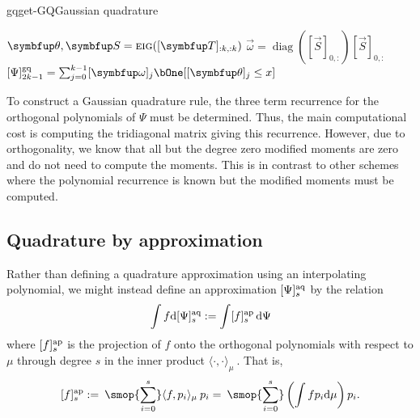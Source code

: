 \begin{labelalgorithm}[H]{gq}{get-GQ}{Gaussian quadrature}
\begin{algorithmic}[1]
    \State \( \vec{\theta}, \vec{S} = \textsc{eig}([\vec{T}]_{:k,:k}) \) 
    \State \( \vec{\omega} = \operatorname{diag}([\vec{S}]_{0,:}) [\vec{S}]_{0,:} \)
    \State \Return \( \qq[g]{\Psi}{2k-1} = \sum_{j=0}^{k-1} [\vec{\omega}]_j \bOne[[\vec{\theta}]_j \leq x] \)
\EndProcedure
\end{algorithmic}
\end{labelalgorithm}

\begin{remark}
    To construct a Gaussian quadrature rule, the three term recurrence for the orthogonal polynomials of \( \Psi \) must be determined. 
    Thus, the main computational cost is computing the tridiagonal matrix giving this recurrence. 
    However, due to orthogonality, we know that all but the degree zero modified moments are zero and do not need to compute the moments.
    This is in contrast to other schemes where the polynomial recurrence is known but the modified moments must be computed.
\end{remark}



\subsection{Quadrature by approximation}
\label{sec:aq}

Rather than defining a quadrature approximation using an interpolating polynomial, we might instead define an approximation \( \qq[a]{\Psi}{s} \) by the relation
\begin{equation*}
    \int f\d\qq[a]{\Psi}{s}
    := \int \ff[a]{f}{s} \,\d\Psi
\end{equation*}
where \( \ff[a]{f}{s} \) is the projection of \( f \) onto the orthogonal polynomials with respect to \( \mu \) through degree \( s \) in the inner product \( \langle \cdot, \cdot\rangle_\mu\: \).
That is,
\begin{equation*}
    \ff[a]{f}{s}
    := \:\smop{\sum_{i=0}^{s}} \langle f, p_i \rangle_\mu\: p_i
    = \:\smop{\sum_{i=0}^{s}} \left(\int f p_i\d\mu \right) p_i.
\end{equation*}

